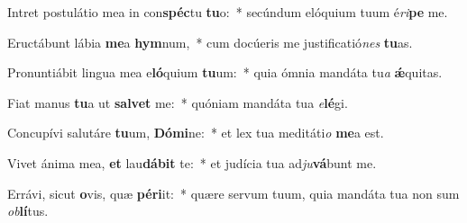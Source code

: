 \item Intret postulátio mea in con\textbf{spéc}tu \textbf{tu}o:~* secúndum elóquium tuum é\textit{ri}\textbf{pe} me.
\item Eructábunt lábia \textbf{me}a \textbf{hym}num,~* cum docúeris me justificatió\textit{nes} \textbf{tu}as.
\item Pronuntiábit lingua mea e\textbf{ló}quium \textbf{tu}um:~* quia ómnia mandáta tu\textit{a} \textbf{ǽ}quitas.
\item Fiat manus \textbf{tu}a ut \textbf{sal}\textbf{vet} me:~* quóniam mandáta tua \textit{e}\textbf{lé}gi.
\item Concupívi salutáre \textbf{tu}um, \textbf{Dó}\textbf{mi}ne:~* et lex tua meditáti\textit{o} \textbf{me}a est.
\item Vivet ánima mea, \textbf{et} lau\textbf{dá}\textbf{bit} te:~* et judícia tua ad\textit{ju}\textbf{vá}bunt me.
\item Errávi, sicut \textbf{o}vis, quæ \textbf{pér}\textbf{i}it:~* quære servum tuum, quia mandáta tua non sum \textit{ob}\textbf{lí}tus.
